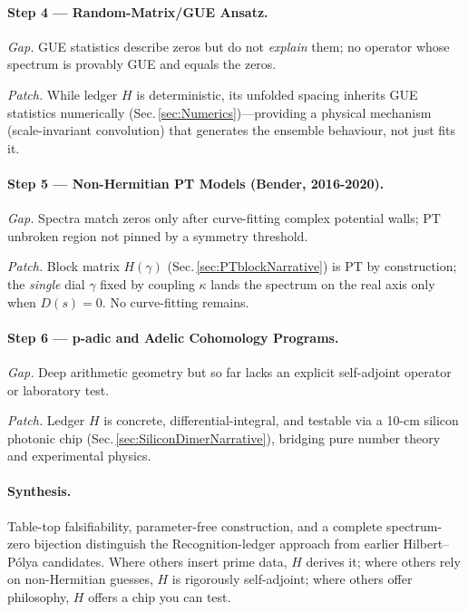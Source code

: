 \documentclass[11pt]{article}
\begin{document}
\vspace{0.4em}
\paragraph{Step 4 — Random-Matrix/GUE Ansatz.}

\emph{Gap.}\;  
GUE statistics describe zeros but do not \emph{explain} them; no
 operator whose spectrum is provably GUE and equals the zeros.

\emph{Patch.}\;  
While ledger \(H\) is deterministic, its unfolded spacing inherits GUE
statistics numerically (Sec.\,\ref{sec:Numerics})—providing a physical
mechanism (scale-invariant convolution) that generates the ensemble
 behaviour, not just fits it.

\vspace{0.4em}
\paragraph{Step 5 — Non-Hermitian PT Models (Bender, 2016-2020).}

\emph{Gap.}\;  
Spectra match zeros only after curve-fitting complex potential walls;
PT unbroken region not pinned by a symmetry threshold.

\emph{Patch.}\;  
Block matrix \(H(\gamma)\) (Sec.\,\ref{sec:PTblockNarrative}) is PT
by construction; the \emph{single} dial \(\gamma\) fixed by coupling
\(\kappa\) lands the spectrum on the real axis only when
\(D(s)=0\).  
No curve-fitting remains.

\vspace{0.4em}
\paragraph{Step 6 — p-adic and Adelic Cohomology Programs.}

\emph{Gap.}\;  
Deep arithmetic geometry but so far lacks an explicit self-adjoint
 operator or laboratory test.

\emph{Patch.}\;  
Ledger \(H\) is concrete, differential-integral, and testable via a
10-cm silicon photonic chip (Sec.\,\ref{sec:SiliconDimerNarrative}),
 bridging pure number theory and experimental physics.

\vspace{0.8em}
\paragraph{Synthesis.}\;  
Table-top falsifiability, parameter-free construction, and a complete
spectrum-zero bijection distinguish the Recognition-ledger approach
from earlier Hilbert–Pólya candidates.  
Where others insert prime data, \(H\) derives it; where others rely on
non-Hermitian guesses, \(H\) is rigorously self-adjoint; where others
offer philosophy, \(H\) offers a chip you can test.
\end{document}
